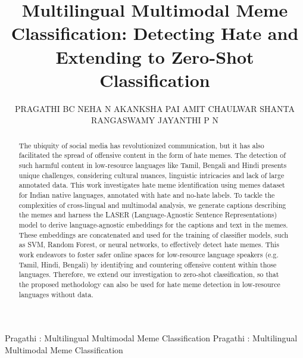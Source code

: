 \documentclass{ieeeaccess}
\begin{document}

\title{Multilingual Multimodal Meme Classification: Detecting Hate and Extending to Zero-Shot Classification}
\author{\uppercase{Pragathi BC} \uppercase{Neha N} \uppercase{Akanksha Pai} \uppercase{Amit Chaulwar} \uppercase{Shanta Rangaswamy} \uppercase{Jayanthi P N}}
\address[1]{Computer Science and Engineering, RV College of Engineering®, Bengaluru, India}
\address[2]{Computer Science and Engineering, RV College of Engineering®, Bengaluru, India}
\address[3]{Computer Science and Engineering, RV College of Engineering®, Bengaluru, India}
\address[4]{Samsung India Ltd, Bengaluru, India}
\address[5]{Computer Science and Engineering, RV College of Engineering®, Bengaluru, India}
\address[6]{Computer Science and Engineering, RV College of Engineering®, Bengaluru, India}

\markboth
{Pragathi \headeretal: Multilingual Multimodal Meme Classification}
{Pragathi \headeretal: Multilingual Multimodal Meme Classification}


\begin{abstract}
The ubiquity of social media has revolutionized communication, but it has also facilitated the spread of offensive content in the form of hate memes. The detection of such harmful content in low-resource languages like Tamil, Bengali and Hindi presents unique challenges, considering cultural nuances, linguistic intricacies and lack of large annotated data. This work investigates hate meme identification using memes dataset for Indian native languages, annotated with hate and no-hate labels. To tackle the complexities of cross-lingual and multimodal analysis, we generate captions describing the memes and harness the LASER (Language-Agnostic Sentence Representations) model to derive language-agnostic embeddings for the captions and text in the memes. These embeddings are concatenated and used for the training of classifier models, such as SVM, Random Forest, or neural networks, to effectively detect hate memes. This work endeavors to foster safer online spaces for low-resource language speakers (e.g. Tamil, Hindi, Bengali) by identifying and countering offensive content within those languages. Therefore, we extend our investigation to zero-shot classification, so that the proposed methodology can also be used for hate meme detection in low-resource languages without data.
\end{abstract}
\end{document}
